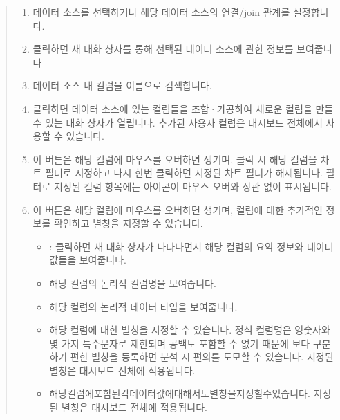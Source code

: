 \documentclass[letterpaper,10pt,english]{sphinxmanual}
\begin{document}
\begin{quote}

\begin{figure}[H]
\centering

\noindent{}
\end{figure}
\begin{enumerate}
\def\theenumi{\arabic{enumi}}
\def\labelenumi{\theenumi .}
\makeatletter\def\p@enumii{\p@enumi \theenumi .}\makeatother
\item {} 
 데이터 소스를 선택하거나 해당 데이터 소스의 연결/join 관계를 설정합니다.

\item {} 
 클릭하면 새 대화 상자를 통해 선택된 데이터 소스에 관한 정보를 보여줍니다

\item {} 
 데이터 소스 내 컬럼을 이름으로 검색합니다.

\item {} 
 클릭하면 데이터 소스에 있는 컬럼들을 조합·가공하여 새로운 컬럼을 만들 수 있는 대화 상자가 열립니다. 추가된 사용자 컬럼은 대시보드 전체에서 사용할 수 있습니다.

\item {} 
 이 버튼은 해당 컬럼에 마우스를 오버하면 생기며, 클릭 시 해당 컬럼을 차트 필터로 지정하고 다시 한번 클릭하면 지정된 차트 필터가 해제됩니다. 필터로 지정된 컬럼 항목에는  아이콘이 마우스 오버와 상관 없이 표시됩니다.

\item {} 
 이 버튼은 해당 컬럼에 마우스를 오버하면 생기며, 컬럼에 대한 추가적인 정보를 확인하고 별칭을 지정할 수 있습니다.
\begin{itemize}
\item {} 
 : 클릭하면 새 대화 상자가 나타나면서 해당 컬럼의 요약 정보와 데이터 값들을 보여줍니다.

\item {} 
 해당 컬럼의 논리적 컬럼명을 보여줍니다.

\item {} 
 해당 컬럼의 논리적 데이터 타입을 보여줍니다.

\item {} 
 해당 컬럼에 대한 별칭을 지정할 수 있습니다. 정식 컬럼명은 영숫자와 몇 가지 특수문자로 제한되며 공백도 포함할 수 없기 때문에 보다 구분하기 편한 별칭을 등록하면 분석 시 편의를 도모할 수 있습니다. 지정된 별칭은 대시보드 전체에 적용됩니다.

\item {} 
 해당컬럼에포함된각데이터값에대해서도별칭을지정할수있습니다. 지정된 별칭은 대시보드 전체에 적용됩니다.

\end{itemize}

\end{enumerate}
\end{quote}
\end{document}

